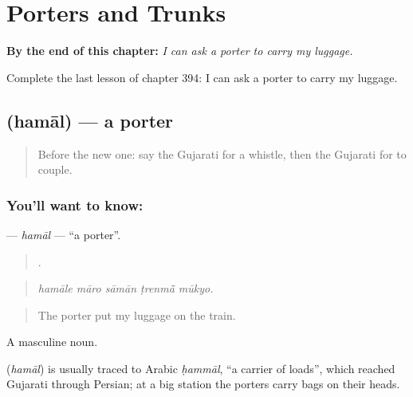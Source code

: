 
\chapter{Porters and Trunks}
\label{ch:gu-porters-and-trunks}

\begin{chapteropening}
\textbf{By the end of this chapter:} \emph{I can ask a porter to carry my luggage.}

Complete the last lesson of chapter 394: I can ask a porter to carry my luggage.
\end{chapteropening}

\section[\texorpdfstring{\gu{હમાલ} (hamāl)}{હમાલ (hamāl)}]{ (hamāl) — a porter}

\label{lesson:GU-C394-hamal}



\begin{quote}
Before the new one: say the Gujarati for a whistle, then the Gujarati for to couple.
\end{quote}

\subsection*{You'll want to know: }
\textbf{} — \emph{hamāl} — \textquotedblleft{}a porter\textquotedblright{}.

\begin{quote}
    .
\end{quote}

\begin{quote}
\emph{hamāle māro sāmān ṭrenmā̃ mūkyo.}
\end{quote}

\begin{quote}
The porter put my luggage on the train.
\end{quote}

A masculine noun.

\begin{cousinweb}
\textbf{} (\emph{hamāl}) is usually traced to Arabic \emph{ḥammāl}, \textquotedblleft{}a carrier of loads\textquotedblright{}, which reached Gujarati through Persian; at a big station the porters carry bags on their heads.
\end{cousinweb}


